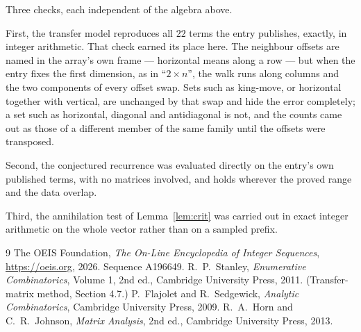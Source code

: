 \documentclass[11pt,a4paper]{article}
\theoremstyle{plain}
\theoremstyle{definition}
\begin{document}
Three checks, each independent of the algebra above.

First, the transfer model reproduces all $22$ terms the entry publishes, exactly, in
integer arithmetic. That check earned its place here. The neighbour offsets are named in the
array's own frame --- horizontal means along a row --- but when the entry fixes the first
dimension, as in ``$2\times n$'', the walk runs along columns and the two components of every
offset swap. Sets such as king-move, or horizontal together with vertical, are unchanged by
that swap and hide the error completely; a set such as horizontal, diagonal and antidiagonal
is not, and the counts came out as those of a different member of the same family until the
offsets were transposed.

Second, the conjectured recurrence was evaluated directly on the entry's own published terms,
with no matrices involved, and holds wherever the proved range and the data overlap.

Third, the annihilation test of Lemma~\ref{lem:crit} was carried out in exact integer
arithmetic on the whole vector rather than on a sampled prefix.

\begin{thebibliography}{9}
 The OEIS Foundation, \emph{The On-Line Encyclopedia of Integer
Sequences}, \url{https://oeis.org}, 2026. Sequence A196649.
 R.~P.~Stanley, \emph{Enumerative Combinatorics}, Volume 1, 2nd ed.,
Cambridge University Press, 2011. (Transfer-matrix method, Section 4.7.)
 P.~Flajolet and R.~Sedgewick, \emph{Analytic Combinatorics}, Cambridge
University Press, 2009.
 R.~A.~Horn and C.~R.~Johnson, \emph{Matrix Analysis}, 2nd ed., Cambridge
University Press, 2013.
\end{thebibliography}
\end{document}
